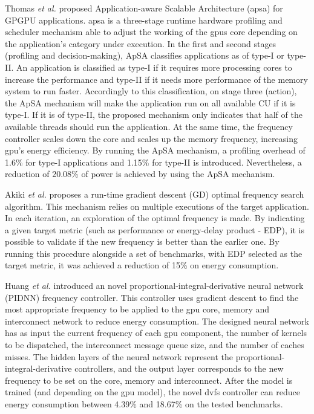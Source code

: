 Thomas \textit{et al.} \cite{thomas_application_2018} proposed Application-aware Scalable Architecture (\acrshort{apsa}) for GPGPU applications. \acrshort{apsa} is a three-stage runtime hardware profiling and scheduler mechanism able to adjust the working of the \acrshort{gpu}s core depending on the application's category under execution. In the first and second stages (profiling and decision-making), ApSA classifies applications as of type-I or type-II. An application is classified as type-I if it requires more processing cores to increase the performance and type-II if it needs more performance of the memory system to run faster. Accordingly to this classification, on stage three (action), the ApSA mechanism will make the application run on all available CU if it is type-I. If it is of type-II, the proposed mechanism only indicates that half of the available threads should run the application. At the same time, the frequency controller scales down the core and scales up the memory frequency, increasing \acrshort{gpu}'s energy efficiency. By running the ApSA mechanism, a profiling overhead of 1.6\% for type-I applications and 1.15\% for type-II is introduced. Nevertheless, a reduction of 20.08\% of power is achieved by using the ApSA mechanism.




Akiki \textit{et al.} \cite{akiki_energy-aware_2018} proposes a run-time gradient descent (GD) optimal frequency search algorithm. This mechanism relies on multiple executions of the target application. In each iteration, an exploration of the optimal frequency is made. By indicating a given target metric (such as performance or energy-delay product - EDP), it is possible to validate if the new frequency is better than the earlier one. By running this procedure alongside a set of benchmarks, with EDP selected as the target metric, it was achieved a reduction of 15\% on energy consumption.

Huang \textit{et al.} \cite{huang_gpu_2019} introduced an novel proportional-integral-derivative neural network (PIDNN) frequency controller. This controller uses gradient descent to find the most appropriate frequency to be applied to the \acrshort{gpu} core, memory and interconnect network to reduce energy consumption. The designed neural network has as input the current frequency of each \acrshort{gpu} component, the number of kernels to be dispatched, the interconnect message queue size, and the number of caches misses. The hidden layers of the neural network represent the proportional-integral-derivative controllers, and the output layer corresponds to the new frequency to be set on the core, memory and interconnect. After the model is trained (and depending on the \acrshort{gpu} model), the novel \acrshort{dvfs} controller can reduce energy consumption between 4.39\% and 18.67\% on the tested benchmarks.




